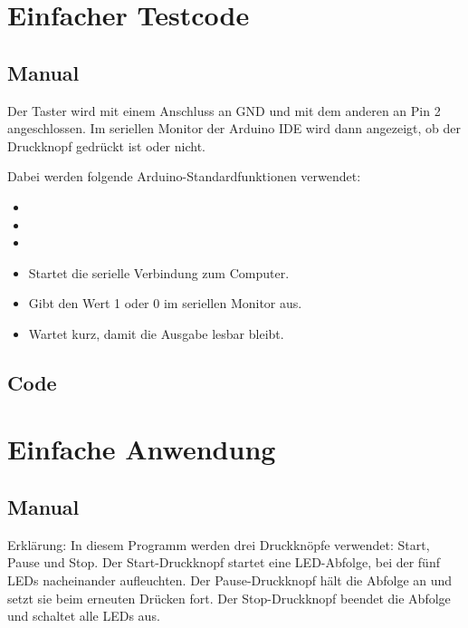 

\section{Einfacher Testcode}

\subsection{Manual}
Der Taster wird mit einem Anschluss an GND und mit dem anderen an Pin 2 angeschlossen. Im seriellen Monitor der Arduino IDE wird dann angezeigt, ob der Druckknopf gedrückt ist oder nicht.

Dabei werden folgende Arduino-Standardfunktionen verwendet:

\begin{itemize}
\item {} 
\item {} 
\item {} 
\item {} Startet die serielle Verbindung zum Computer.\cite{arduino_serialbegin}
\item {} Gibt den Wert 1 oder 0 im seriellen Monitor aus. \cite{arduino_serialprint}
\item {} Wartet kurz, damit die Ausgabe lesbar bleibt. \cite{arduino_delay}
\end{itemize}
\subsection{Code}
{
	\label{lst:druckknopftest}
}

\section{Einfache Anwendung}


\subsection{Manual}
Erklärung:
In diesem Programm werden drei Druckknöpfe verwendet: Start, Pause und Stop. Der Start-Druckknopf startet eine LED-Abfolge, bei der fünf LEDs nacheinander aufleuchten. Der Pause-Druckknopf hält die Abfolge an und setzt sie beim erneuten Drücken fort. Der Stop-Druckknopf beendet die Abfolge und schaltet alle LEDs aus.

